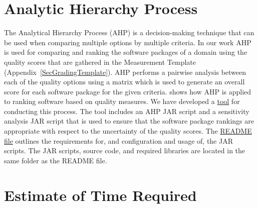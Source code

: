 \documentclass[letterpaper,cleveref]{lipics-v2019}
\begin{document}
\section{Analytic Hierarchy Process} \label{SecAHP}

The Analytical Hierarchy Process (AHP) is a decision-making technique that can
be used when comparing multiple options by multiple criteria. In our work AHP is
used for comparing and ranking the software packages of a domain using the
quality scores that are gathered in the Measurement Template
(Appendix~\ref{SecGradingTemplate}). AHP performs a pairwise analysis between
each of the quality options using a matrix which is used to generate an overall
score for each software package for the given criteria. \cite{SmithEtAl2016}
shows how AHP is applied to ranking software based on quality measures. We have
developed a
\href{https://github.com/smiths/AIMSS/blob/master/StateOfPractice/AHP2020/LBM/README.txt}{tool}
for conducting this process. The tool includes an AHP JAR script and a
sensitivity analysis JAR script that is used to ensure that the software package
rankings are appropriate with respect to the uncertainty of the quality scores.
The
\href{https://github.com/smiths/AIMSS/blob/master/StateOfPractice/AHP2020/LBM/README.txt}{README
file} outlines the requirements for, and configuration and usage of, the JAR
scripts. The JAR scripts, source code, and required libraries are located in the
same folder as the README file.



\section{Estimate of Time Required} \label{SecEstTimeRequired}
\end{document}

